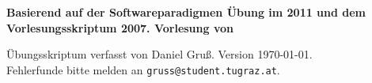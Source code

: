 
\thispagestyle{empty}

\begin{center}
\vspace*{5cm}
\huge{\textbf{\titel}}

\vspace*{1cm}

\large{\textbf{Basierend auf der Softwareparadigmen Übung im 2011 und dem Vorlesungsskriptum 2007. Vorlesung von \vortragender}}
\end{center}
\clearpage

\begin{center}
Übungsskriptum verfasst von Daniel Gruß. Version \today. \\
Fehlerfunde bitte melden an \verb|gruss@student.tugraz.at|.
\end{center}
\clearpage

\tableofcontents
\cleardoublepage


